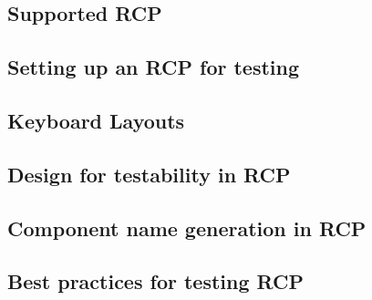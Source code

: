 

\subsection{Supported RCP \gdauts{}}


\subsection{Setting up an RCP \gdaut{} for testing}


\subsection{Keyboard Layouts}


\subsection{Design for testability in RCP}


\subsection{Component name generation in RCP}
\label{RCPgenerate}


\subsection{Best practices for testing RCP \gdauts{}}

